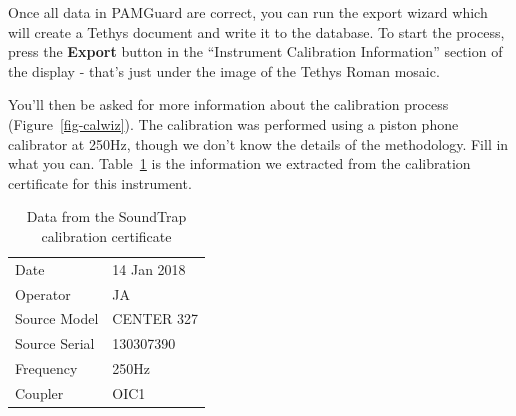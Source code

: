 \documentclass[
]{article}
\begin{document}
Once all data in PAMGuard are correct, you can run the export wizard
which will create a Tethys document and write it to the database. To
start the process, press the \textbf{Export} button in the ``Instrument
Calibration Information'' section of the display - that's just under the
image of the Tethys Roman mosaic.

You'll then be asked for more information about the calibration process
(Figure~\ref{fig-calwiz}). The calibration was performed using a piston
phone calibrator at 250Hz, though we don't know the details of the
methodology. Fill in what you can. Table~\ref{tbl-caldata} is the
information we extracted from the calibration certificate for this
instrument.

\begin{longtable}[]{@{}ll@{}}
\caption{Data from the SoundTrap calibration
certificate}\label{tbl-caldata}\tabularnewline
\toprule\noalign{}
\endfirsthead
\endhead
\bottomrule\noalign{}
\endlastfoot
Date & 14 Jan 2018 \\
Operator & JA \\
Source Model & CENTER 327 \\
Source Serial & 130307390 \\
Frequency & 250Hz \\
Coupler & OIC1 \\
\end{longtable}
\end{document}
